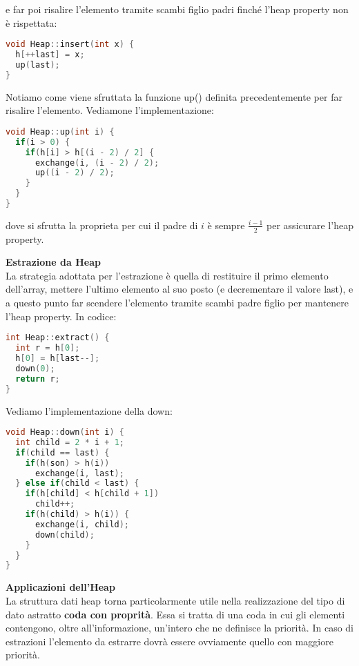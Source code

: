 \documentclass[a4paper,12pt]{article}
\begin{document}
e far poi risalire l'elemento tramite scambi figlio padri finché l'heap property non è rispettata:
\begin{lstlisting}[language=C++]
void Heap::insert(int x) {
  h[++last] = x;
  up(last);
}
\end{lstlisting}
Notiamo come viene sfruttata la funzione up() definita precedentemente per far risalire l'elemento. Vediamone l'implementazione:
\begin{lstlisting}[language=C++]
void Heap::up(int i) {
  if(i > 0) {
    if(h[i] > h[(i - 2) / 2] {
      exchange(i, (i - 2) / 2);
      up((i - 2) / 2);
    }
  }
}
\end{lstlisting}
dove si sfrutta la proprieta per cui il padre di $i$ è sempre $\frac{i-1}{2}$ per assicurare l'heap property.
\par\smallskip
\textbf{Estrazione da Heap} \\
La strategia adottata per l'estrazione è quella di restituire il primo elemento dell'array, mettere l'ultimo elemento al suo posto (e
decrementare il valore last), e a questo punto far scendere l'elemento tramite scambi padre figlio per mantenere l'heap property. In codice:
\begin{lstlisting}[language=C++]
int Heap::extract() {
  int r = h[0];
  h[0] = h[last--];
  down(0);
  return r;
}
\end{lstlisting}
Vediamo l'implementazione della down:
\begin{lstlisting}[language=C++]
void Heap::down(int i) {
  int child = 2 * i + 1;
  if(child == last) {
    if(h(son) > h(i))
      exchange(i, last);
  } else if(child < last) {
    if(h[child] < h[child + 1])
      child++;
    if(h(child) > h(i)) {
      exchange(i, child);
      down(child);
    }
  }
}
\end{lstlisting}
\par\smallskip
\textbf{Applicazioni dell'Heap} \\
La struttura dati heap torna particolarmente utile nella realizzazione del tipo di dato astratto \textbf{coda
con proprità}. Essa si tratta di una coda in cui gli elementi contengono, oltre all'informazione, un'intero
che ne definisce la priorità. In caso di estrazioni l'elemento da estrarre dovrà essere ovviamente quello con maggiore
priorità.
\end{document}
